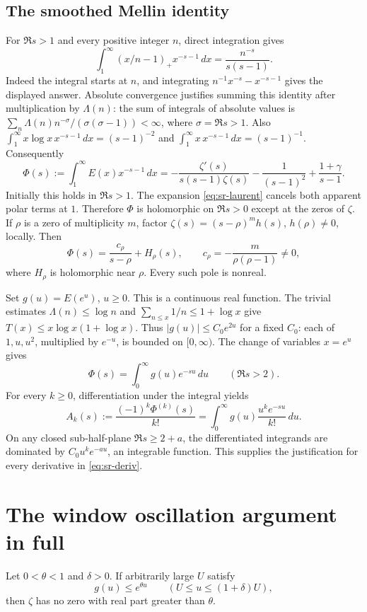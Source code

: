 \subsection{The smoothed Mellin identity}
For \(\Re s>1\) and every positive integer \(n\), direct integration gives
\[
 \int_1^\infty(x/n-1)_+x^{-s-1}\,dx
 =\frac{n^{-s}}{s(s-1)}.
\]
Indeed the integral starts at \(n\), and integrating
\(n^{-1}x^{-s}-x^{-s-1}\) gives the displayed answer.
Absolute convergence justifies summing this identity after multiplication
by \(\Lambda(n)\): the sum of integrals of absolute values is
\(\sum_n\Lambda(n)n^{-\sigma}/(\sigma(\sigma-1))<\infty\),
where \(\sigma=\Re s>1\). Also
\(\int_1^\infty x\log x\,x^{-s-1}\,dx=(s-1)^{-2}\) and
\(\int_1^\infty x\,x^{-s-1}\,dx=(s-1)^{-1}\). Consequently
\begin{equation}\label{eq:sr-mellin}
 \Phi(s):=\int_1^\infty E(x)x^{-s-1}\,dx
 =-\frac{\zeta'(s)}{s(s-1)\zeta(s)}
       -\frac1{(s-1)^2}+\frac{1+\gamma}{s-1}.
\end{equation}
Initially this holds in \(\Re s>1\).
The expansion \eqref{eq:sr-laurent} cancels both apparent polar terms at
\(1\). Therefore \(\Phi\) is holomorphic on \(\Re s>0\) except at the
zeros of \(\zeta\). If \(\rho\) is a zero of multiplicity \(m\), factor
\(\zeta(s)=(s-\rho)^m h(s)\), \(h(\rho)\ne0\), locally. Then
\[
 \Phi(s)=\frac{c_\rho}{s-\rho}+H_\rho(s),\qquad
 c_\rho=-\frac{m}{\rho(\rho-1)}\ne0,
\]
where \(H_\rho\) is holomorphic near \(\rho\).
Every such pole is nonreal.

Set \(g(u)=E(e^u)\), \(u\geq0\). This is a continuous real function.
The trivial estimates \(\Lambda(n)\leq\log n\) and
\(\sum_{n\leq x}1/n\leq1+\log x\) give
\(T(x)\leq x\log x(1+\log x)\).
Thus \(|g(u)|\leq C_0 e^{2u}\) for a fixed \(C_0\):
each of \(1,u,u^2\), multiplied by \(e^{-u}\), is bounded on
\([0,\infty)\). The change of variables \(x=e^u\) gives
\[
 \Phi(s)=\int_0^\infty g(u)e^{-su}\,du\qquad(\Re s>2).
\]
For every \(k\geq0\), differentiation under the integral yields
\begin{equation}\label{eq:sr-deriv}
 A_k(s):=\frac{(-1)^k\Phi^{(k)}(s)}{k!}
 =\int_0^\infty g(u)\frac{u^k e^{-su}}{k!}\,du .
\end{equation}
On any closed sub-half-plane \(\Re s\geq2+a\), the differentiated
integrands are dominated by \(C_0u^k e^{-au}\), an integrable function.
This supplies the justification for every derivative in \eqref{eq:sr-deriv}.

\section{The window oscillation argument in full}\label{sec:sr-landau}
\begin{srtheorem}\label{thm:sr-window}
Let \(0<\theta<1\) and \(\delta>0\). If arbitrarily large \(U\) satisfy
\[
 g(u)\leq e^{\theta u}\qquad(U\leq u\leq(1+\delta)U),
\]
then \(\zeta\) has no zero with real part greater than \(\theta\).
\end{srtheorem}

